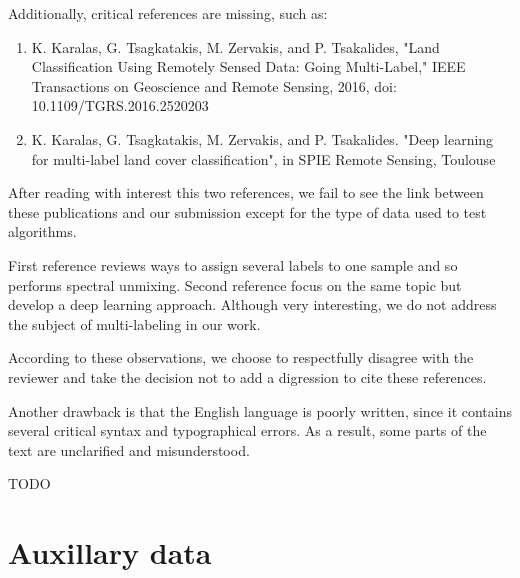 \documentclass[a4paper,10pt,DIV=16]{scrartcl}
\begin{document}
\begin{revbox}
  Additionally, critical references are missing, such as:
  \begin{enumerate}
  \item K. Karalas, G. Tsagkatakis, M. Zervakis, and P. Tsakalides, "Land Classification Using Remotely Sensed Data: Going Multi-Label," IEEE Transactions on Geoscience and Remote Sensing, 2016, doi: 10.1109/TGRS.2016.2520203
  \item K. Karalas, G. Tsagkatakis, M. Zervakis, and P. Tsakalides. "Deep learning for multi-label land cover classification", in SPIE Remote Sensing, Toulouse
  \end{enumerate}

  \begin{resbox}
    After reading with interest this two references, we fail to see the link between these publications and our submission except for the type of data used to test algorithms.

    First reference reviews ways to assign several labels to one sample and so performs spectral unmixing. Second reference focus on the same topic but develop a deep learning approach. Although very interesting, we do not address the subject of multi-labeling in our work.

    According to these observations, we choose to respectfully disagree with the reviewer and take the decision not to add a digression to cite these references.
  \end{resbox}
\end{revbox}

\begin{revbox}
  Another drawback is that the English language is poorly written, since it contains several critical syntax and typographical errors. As a result, some parts of the text are unclarified and misunderstood.
  \begin{resbox}

  TODO

  \end{resbox}
\end{revbox}
 

\section{Auxillary data}
\label{sec:auxillary}
\end{document}
